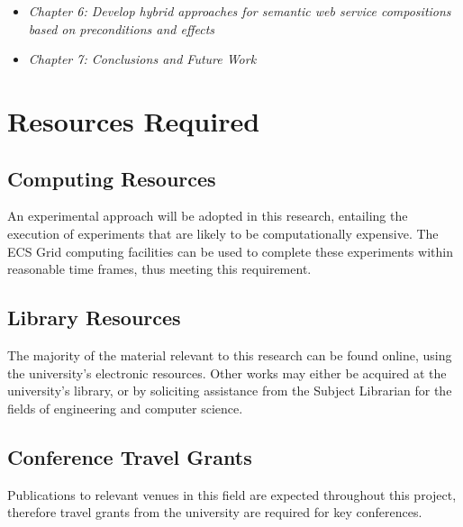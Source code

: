 \begin{itemize}
 \item \textit{Chapter 6: Develop hybrid approaches for semantic web service compositions based on preconditions and effects}\\
 \item \textit{Chapter 7: Conclusions and Future Work}\\
\end{itemize}


\section{Resources Required}

\subsection{Computing Resources}
An experimental approach will be adopted in this research, entailing the execution of experiments that are likely to be computationally expensive. The ECS Grid computing facilities can be used to complete these experiments within reasonable time frames, thus meeting this requirement.

\subsection{Library Resources}
The majority of the material relevant to this research can be found online, using the university's electronic resources. Other works may either be acquired at the university's library, or by soliciting assistance from the Subject Librarian for the fields of engineering and computer science.

\subsection{Conference Travel Grants}
Publications to relevant venues in this field are expected throughout this project, therefore travel grants from the university are required for key conferences.
